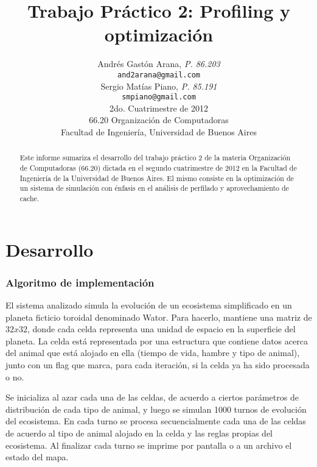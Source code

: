 \documentclass[a4paper,11pt]{article}
\title{\textbf{Trabajo Práctico 2: Profiling y optimización}}
\author{
  Andrés Gastón Arana, \textit{P. 86.203}                          \\
  \texttt{and2arana@gmail.com}                                     \\
  Sergio Matías Piano, \textit{P. 85.191}                          \\
  \texttt{smpiano@gmail.com}                                       \\ [2.5ex]
  \normalsize{2do. Cuatrimestre de 2012}                           \\
  \normalsize{66.20 Organización de Computadoras}                  \\
  \normalsize{Facultad de Ingeniería, Universidad de Buenos Aires}
}
\date{}
\begin{document}
\thispagestyle{empty}
\maketitle

\begin{abstract}

  Este informe sumariza el desarrollo del trabajo práctico 2 de la materia
  Organización de Computadoras (66.20) dictada en el segundo cuatrimestre de
  2012 en la Facultad de Ingeniería de la Universidad de Buenos Aires. El mismo
  consiste en la optimización de un sistema de simulación con énfasis en el
  análisis de perfilado y aprovechamiento de cache.

\end{abstract}

\clearpage

\tableofcontents
\clearpage


\part{Desarrollo}

\section{Algoritmo de implementación}

El sistema analizado simula la evolución de un ecosistema simplificado en un
planeta ficticio toroidal denominado Wator. Para hacerlo, mantiene una matriz
de \(32x32\), donde cada celda representa una unidad de espacio en la
superficie del planeta. La celda está representada por una estructura que
contiene datos acerca del animal que está alojado en ella (tiempo de vida,
hambre y tipo de animal), junto con un flag que marca, para cada iteración, si
la celda ya ha sido procesada o no.

Se inicializa al azar cada una de las celdas, de acuerdo a ciertos parámetros
de distribución de cada tipo de animal, y luego se simulan 1000 turnos de
evolución del ecosistema. En cada turno se procesa secuencialmente cada una de
las celdas de acuerdo al tipo de animal alojado en la celda y las reglas
propias del ecosistema. Al finalizar cada turno se imprime por pantalla o a un
archivo el estado del mapa.
\end{document}
